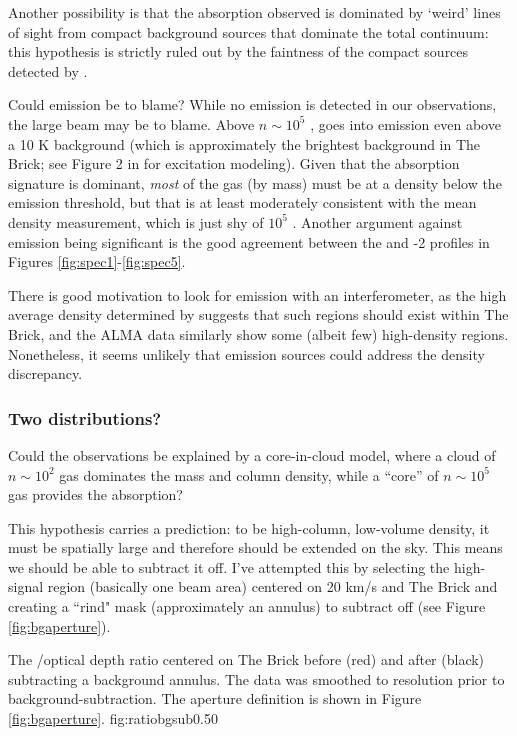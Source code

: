 Another possibility is that the absorption observed is dominated by `weird'
lines of sight from compact background sources that dominate the total
continuum: this hypothesis is strictly ruled out by the faintness of the
compact sources detected by \citet{Rodriguez2013a}.

Could \formaldehyde emission be to blame?  While no \formaldehyde emission is
detected in our observations, the large beam may be to blame.  Above
$n\sim10^5$ \percc, \formaldehyde goes into emission even above a 10 K
background (which is approximately the brightest background in The Brick; see
Figure 2 in \citet{Darling2012b} for excitation modeling).  Given that the
absorption signature is dominant, \emph{most} of the gas (by mass) must be at a
density below the emission threshold, but that is at least moderately
consistent with the \citet{Longmore2012b} mean density measurement, which is
just shy of $10^5$ \percc.  Another argument against \formaldehyde emission
being significant is the good agreement between the \formaldehyde and -2 profiles in Figures \ref{fig:spec1}-\ref{fig:spec5}.

There is good motivation to look for \formaldehyde emission with an
interferometer, as the high average density determined by \citet{Longmore2012b}
suggests that such regions should exist within The Brick, and the ALMA data
similarly show some (albeit few) high-density regions.  Nonetheless, it seems
unlikely that emission sources could address the density discrepancy.

\subsubsection{Two distributions?}
Could the \formaldehyde observations be explained by a core-in-cloud model,
where a cloud of $n\sim10^2$ \percc gas dominates the mass and column density,
while a ``core'' of $n\sim10^5$ \percc gas provides the \twotwo absorption?

This hypothesis carries a prediction: to be high-column, low-volume density,
it must be spatially large and therefore should be extended on the sky. This
means we should be able to subtract it off.  I've attempted this by selecting
the high-signal region (basically one beam area) centered on 20 km/s and The Brick
and creating a ``rind" mask (approximately an annulus) to subtract off (see Figure \ref{fig:bgaperture}).

{The \formaldehyde \oneone/\twotwo optical depth ratio centered on The Brick
before (red) and after (black) subtracting a background annulus.  The
\twotwo data was smoothed to \oneone resolution prior to background-subtraction.
The aperture definition is shown in Figure \ref{fig:bgaperture}.}
{fig:ratiobgsub}{0.5}{0}

